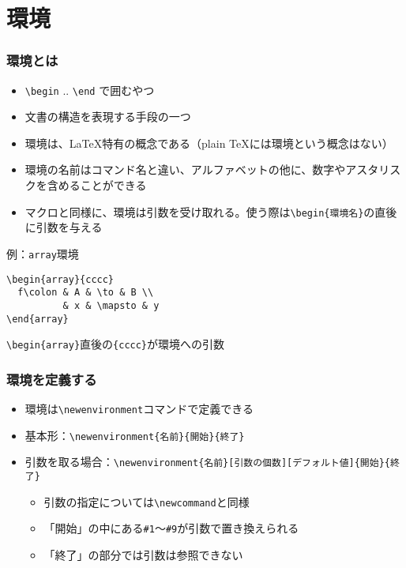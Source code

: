\documentclass[aspectratio=169]{beamer}
\newcommand\cmdname[1]{\texttt{\textbackslash #1}}
\begin{document}
\section{環境}
\begin{frame}[fragile]\frametitle{環境とは}
  \begin{itemize}
  \item \cmdname{begin} .. \cmdname{end} で囲むやつ
  \item 文書の構造を表現する手段の一つ
  \item 環境は、\LaTeX 特有の概念である（plain \TeX には環境という概念はない）
  \item 環境の名前はコマンド名と違い、アルファベットの他に、数字やアスタリスクを含めることができる
  \item マクロと同様に、環境は引数を受け取れる。使う際は\texttt{\textbackslash begin\{環境名\}}の直後に引数を与える \\
  \end{itemize}
  \begin{exampleblock}{例：\texttt{array}環境}
\begin{lstlisting}
\begin{array}{cccc}
  f\colon & A & \to & B \\
          & x & \mapsto & y
\end{array}
\end{lstlisting}
\texttt{\textbackslash begin\{array\}}直後の\texttt{\{cccc\}}が環境への引数
\end{exampleblock}
\end{frame}
\begin{frame}[fragile]\frametitle{環境を定義する}
  \begin{itemize}
  \item 環境は\cmdname{newenvironment}コマンドで定義できる
  \item 基本形：\lstinline!\newenvironment{名前}{開始}{終了}!
  \item 引数を取る場合：\lstinline!\newenvironment{名前}[引数の個数][デフォルト値]{開始}{終了}!
    \begin{itemize}
    \item 引数の指定については\cmdname{newcommand}と同様
    \item 「開始」の中にある\texttt{\#1}〜\texttt{\#9}が引数で置き換えられる
    \item 「終了」の部分では引数は参照できない
    \end{itemize}
  \end{itemize}
\end{frame}
\end{document}
